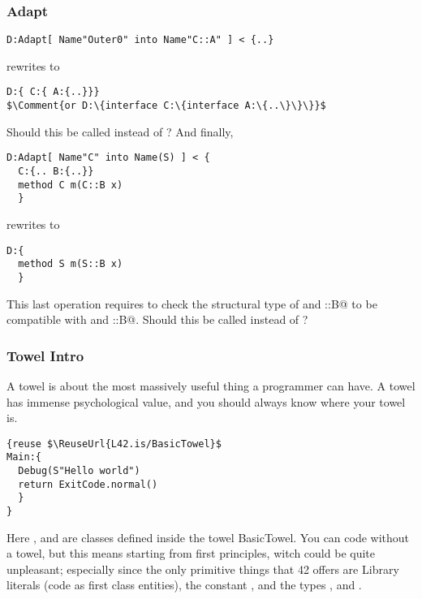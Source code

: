 \begin{frame}[fragile]
\frametitle{Adapt}
\begin{NiceCode}{59ex}{0.8}
\begin{lstlisting}
D:Adapt[ Name"Outer0" into Name"C::A" ] < {..}
\end{lstlisting}
\end{NiceCode}
rewrites to 
\begin{NiceCode}{59ex}{0.8}
\begin{lstlisting}
D:{ C:{ A:{..}}}
$\Comment{or D:\{interface C:\{interface A:\{..\}\}\}}$
\end{lstlisting}
\end{NiceCode}
Should this be called \Q@Move@ instead of \Q@Adapt@?
And finally,

\begin{NiceCode}{59ex}{0.8}
\begin{lstlisting}
D:Adapt[ Name"C" into Name(S) ] < {
  C:{.. B:{..}}
  method C m(C::B x)
  }
\end{lstlisting}
\end{NiceCode}
rewrites to 
\begin{NiceCode}{59ex}{0.8}
\begin{lstlisting}
D:{
  method S m(S::B x)
  }
\end{lstlisting}
\end{NiceCode}
This last operation requires to check the structural type of
\Q@S@ and \Q@S::B@ to be compatible with \Q@C@ and \Q@C::B@.
Should this be called \Q@Replace@ instead of \Q@Adapt@?
\end{frame}



\begin{frame}[fragile]
\frametitle{Towel Intro}
A towel is about the most massively useful thing a programmer can have.
A towel has immense psychological value, and you should always know where your towel is.
\begin{NiceCode}{59ex}{1}
\begin{lstlisting}
{reuse $\ReuseUrl{L42.is/BasicTowel}$
Main:{
  Debug(S"Hello world")
  return ExitCode.normal()
  }
}
\end{lstlisting}
\end{NiceCode}
Here \Q@Debug@, \Q@S@ and \Q@ExitCode@ are classes defined inside the towel
BasicTowel.
You can code without a towel, but this means starting from first principles,
witch could be quite unpleasant; especially since the only
primitive things that 42 offers are Library literals
(code as first class entities), the constant \Q@void@,
and the types \Q@Library@, \Q@Void@ and \Q@Any@.
\end{frame}

